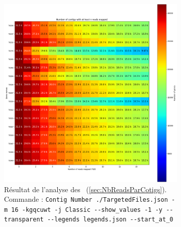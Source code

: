 \documentclass[../main]{subfiles} %
\begin{document}
\addto\extrasfrench{\protected\edef:{\unexpanded\expandafter{:}}}

\begin{landscape}
\begin{figure}[p]
    \centering
    \begin{subfigure}[b]{0.55\paperwidth}
        \centering
        \includegraphics[width=\textwidth]{../Illustrations/Ex_Analysis_Contig_Heatmap_global.png}
        \caption{Résultat de l'analyse des \BamTrEx (\ref{sec:NbReadsParCotigs}).\\
        Commande : \lstinline{Contig Number ./TargetedFiles.json -m 16 -kgqcuwt -j Classic --show_values -1 -y --transparent --legends legends.json --start_at_0}  
        }
        \label{fig:ContigsExClassic}
    \end{subfigure}
    \hfill
    \begin{subfigure}[b]{0.55\paperwidth}
        \centering

\end{subfigure}
\end{figure}
\end{landscape}
\end{document}
